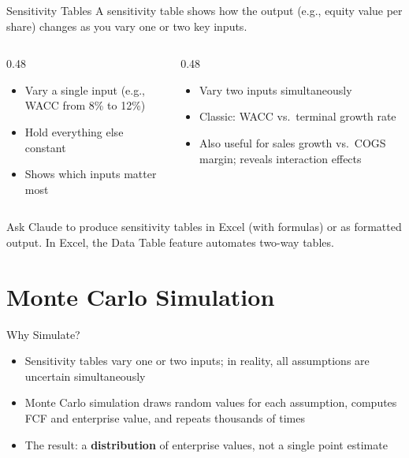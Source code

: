 \documentclass[aspectratio=169]{beamer}
\begin{document}
\begin{frame}{Sensitivity Tables}
A sensitivity table shows how the output (e.g., equity value per share) changes as you vary one or two key inputs.
\vspace{0.3cm}
\begin{columns}[T]
\begin{column}{0.48\textwidth}
\begin{shadedbox}[title=\textbf{One-Way Table}]
\begin{itemize}\small
  \item Vary a single input (e.g., WACC from 8\% to 12\%)
  \item Hold everything else constant
  \item Shows which inputs matter most
\end{itemize}
\end{shadedbox}
\end{column}
\begin{column}{0.48\textwidth}
\begin{shadedbox}[title=\textbf{Two-Way Table}]
\begin{itemize}\small
  \item Vary two inputs simultaneously
  \item Classic: WACC vs.\ terminal growth rate
  \item Also useful for sales growth vs.\ COGS margin; reveals interaction effects
\end{itemize}
\end{shadedbox}
\end{column}
\end{columns}
\vspace{0.3cm}
Ask Claude to produce sensitivity tables in Excel (with formulas) or as formatted output.  In Excel, the Data Table feature automates two-way tables.
\end{frame}

\section{Monte Carlo Simulation}

\begin{frame}{Why Simulate?}
\vfill
\begin{itemize}
  \item Sensitivity tables vary one or two inputs; in reality, \alert{all assumptions are uncertain simultaneously}
  \item Monte Carlo simulation draws random values for each assumption, computes FCF and enterprise value, and repeats thousands of times
  \item The result: a \textbf{distribution} of enterprise values, not a single point estimate
\end{itemize}
\end{frame}
\end{document}
